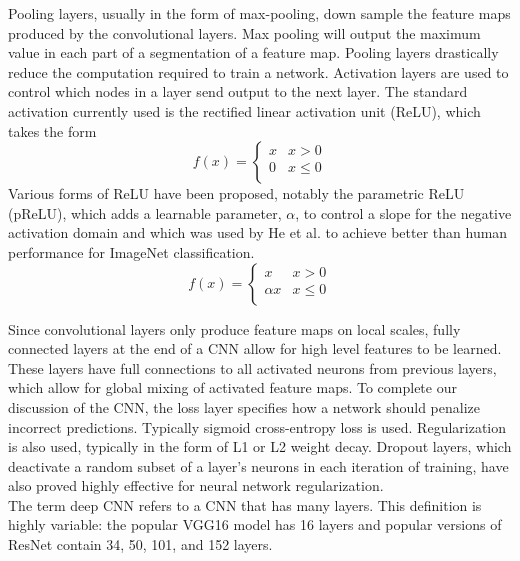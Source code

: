 \documentclass[pageno]{jpaper}
\begin{document}
Pooling layers, usually in the form of max-pooling, down sample the feature maps produced by the convolutional layers. Max pooling will output the maximum value in each part of a segmentation of a feature map. Pooling layers drastically reduce the computation required to train a network. Activation layers are used to control which nodes in a layer send output to the next layer. The standard activation currently used is the rectified linear activation unit (ReLU), which takes the form
\begin{equation}
	f(x) = \begin{cases}
	   x & x > 0 \\
	   0 & x\leq 0 \\
     \end{cases}
\end{equation}
Various forms of ReLU have been proposed, notably the parametric ReLU (pReLU), which adds a learnable parameter, $\alpha$, to control a slope for the negative activation domain and which was used by He et al. to achieve better than human performance for ImageNet classification.\cite{he2016deep}
\begin{equation}
	f(x) = \begin{cases}
	   x & x > 0 \\
	   \alpha x & x \leq 0 \\
     \end{cases}
\end{equation}

Since convolutional layers only produce feature maps on local scales, fully connected layers at the end of a CNN allow for high level features to be learned. These layers have full connections to all activated neurons from previous layers, which allow for global mixing of activated feature maps. To complete our discussion of the CNN, the loss layer specifies how a network should penalize incorrect predictions. Typically sigmoid cross-entropy loss is used. Regularization is also used, typically in the form of L1 or L2 weight decay. Dropout layers, which deactivate a random subset of a layer's neurons in each iteration of training, have also proved highly effective for neural network regularization.\cite{srivastava2014dropout}\\

The term deep CNN refers to a CNN that has many layers. This definition is highly variable: the popular VGG16 model has 16 layers\cite{simonyan2014very} and popular versions of ResNet contain 34, 50, 101, and 152 layers\cite{he2016deep}.\\
\end{document}
